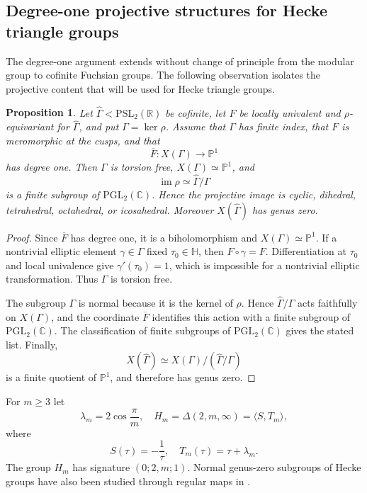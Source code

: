 \documentclass[11pt]{amsart}
\newtheorem{prop}[thm]{Proposition}
\theoremstyle{definition}
\theoremstyle{remark}
\numberwithin{equation}{section}
\begin{document}
\subsection{Degree-one projective structures for Hecke triangle groups}\label{subsec:hecke-degree-one}

The degree-one argument extends without change of principle from the modular group to cofinite Fuchsian groups. The following observation isolates the projective content that will be used for Hecke triangle groups.

\begin{prop}\label{prop:general-degree-one-fuchsian}
Let $\widehat\Gamma<\mathrm{PSL}_2(\mathbb R)$ be cofinite, let $F$ be locally univalent and $\rho$-equivariant for $\widehat\Gamma$, and put $\Gamma=\ker\rho$. Assume that $\Gamma$ has finite index, that $F$ is meromorphic at the cusps, and that
\[
\overline F:X(\Gamma)\longrightarrow\mathbb P^1
\]
has degree one. Then $\Gamma$ is torsion free, $X(\Gamma)\simeq\mathbb P^1$, and
\[
\operatorname{im}\rho\simeq \widehat\Gamma/\Gamma
\]
is a finite subgroup of $\mathrm{PGL}_2(\mathbb C)$. Hence the projective image is cyclic, dihedral, tetrahedral, octahedral, or icosahedral. Moreover $X(\widehat\Gamma)$ has genus zero.
\end{prop}

\begin{proof}
Since $\overline F$ has degree one, it is a biholomorphism and $X(\Gamma)\simeq\mathbb P^1$. If a nontrivial elliptic element $\gamma\in\Gamma$ fixed $\tau_0\in\mathbb H$, then $F\circ\gamma=F$. Differentiation at $\tau_0$ and local univalence give $\gamma'(\tau_0)=1$, which is impossible for a nontrivial elliptic transformation. Thus $\Gamma$ is torsion free.

The subgroup $\Gamma$ is normal because it is the kernel of $\rho$. Hence $\widehat\Gamma/\Gamma$ acts faithfully on $X(\Gamma)$, and the coordinate $\overline F$ identifies this action with a finite subgroup of $\mathrm{PGL}_2(\mathbb C)$. The classification of finite subgroups of $\mathrm{PGL}_2(\mathbb C)$ gives the stated list. Finally,
\[
X(\widehat\Gamma)\simeq X(\Gamma)/(\widehat\Gamma/\Gamma)
\]
is a finite quotient of $\mathbb P^1$, and therefore has genus zero.
\end{proof}

For $m\geq3$ let
\[
\lambda_m=2\cos\frac{\pi}{m},
\quad
H_m=\Delta(2,m,\infty)=\langle S,T_m\rangle,
\]
where
\[
S(\tau)=-\frac1\tau,
\quad
T_m(\tau)=\tau+\lambda_m.
\]
The group $H_m$ has signature $(0;2,m;1)$. Normal genus-zero subgroups of Hecke groups have also been studied through regular maps in \cite{cangul-singerman}.
\end{document}
